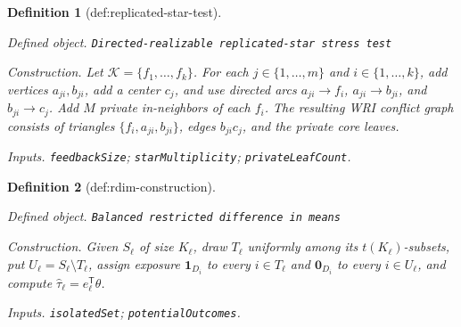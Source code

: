 \documentclass{article}
\newtheorem{definition}{Definition}
\begin{document}
\begin{definition}[def:replicated-star-test]\label{def:replicated-star-test}
\par\smallskip\noindent\emph{Defined object.} \texttt{Directed-\allowbreak{}realizable replicated-\allowbreak{}star stress test}
\par\smallskip\noindent\emph{Construction.} Let \(\mathcal K=\{f_1,\ldots,f_k\}\). For each \(j\in\{1,\ldots,m\}\) and \(i\in\{1,\ldots,k\}\), add vertices \(a_{ji},b_{ji}\), add a center \(c_j\), and use directed arcs \(a_{ji}\to f_i\), \(a_{ji}\to b_{ji}\), and \(b_{ji}\to c_j\). Add \(M\) private in-neighbors of each \(f_i\). The resulting WRI conflict graph consists of triangles \(\{f_i,a_{ji},b_{ji}\}\), edges \(b_{ji}c_j\), and the private core leaves.
\par\smallskip\noindent\emph{Inputs.} \texttt{feedbackSize}; \texttt{starMultiplicity}; \texttt{privateLeafCount}.
\end{definition}

\begin{definition}[def:rdim-construction]\label{def:rdim-construction}
\par\smallskip\noindent\emph{Defined object.} \texttt{Balanced restricted difference in means}
\par\smallskip\noindent\emph{Construction.} Given \(S_{\ell}\) of size \(K_{\ell}\), draw \(T_{\ell}\) uniformly among its \(t(K_{\ell})\)-subsets, put \(U_{\ell}=S_{\ell}\setminus T_{\ell}\), assign exposure \(\mathbf 1_{D_i}\) to every \(i\in T_{\ell}\) and \(\mathbf 0_{D_i}\) to every \(i\in U_{\ell}\), and compute \(\widehat\tau_{\ell}=e_{\ell}^{\mathsf T}\theta\).
\par\smallskip\noindent\emph{Inputs.} \texttt{isolatedSet}; \texttt{potentialOutcomes}.
\end{definition}
\end{document}
